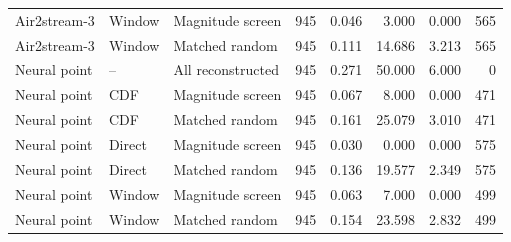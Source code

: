 \begin{table}
{\begin{tabular}{lllrrrrr}
Air2stream-3 & Window & Magnitude screen & 945 & 0.046 & 3.000 & 0.000 & 565 \\
Air2stream-3 & Window & Matched random & 945 & 0.111 & 14.686 & 3.213 & 565 \\
Neural point & -- & All reconstructed & 945 & 0.271 & 50.000 & 6.000 & 0 \\
Neural point & CDF & Magnitude screen & 945 & 0.067 & 8.000 & 0.000 & 471 \\
Neural point & CDF & Matched random & 945 & 0.161 & 25.079 & 3.010 & 471 \\
Neural point & Direct & Magnitude screen & 945 & 0.030 & 0.000 & 0.000 & 575 \\
Neural point & Direct & Matched random & 945 & 0.136 & 19.577 & 2.349 & 575 \\
Neural point & Window & Magnitude screen & 945 & 0.063 & 7.000 & 0.000 & 499 \\
Neural point & Window & Matched random & 945 & 0.154 & 23.598 & 2.832 & 499 \\
\bottomrule
\end{tabular}
}
\end{table}
